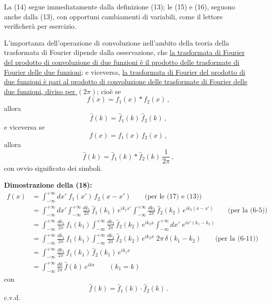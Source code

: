 \documentclass[11pt, a4paper]{book}
\numberwithin{equation}{section}
\begin{document}
La (14) segue immediatamente dalla definizione (13); le (15) e (16), seguono anche dalla (13), con opportuni cambiamenti di variabili, come il lettore verificherà per esercizio.

L'importanza dell'operazione di convoluzione nell'ambito della teoria della trasformata di Fourier dipende dalla osservazione, che \underline{la trasformata di Fourier del prodotto di convoluzione di due funzioni è il prodotto delle trasformate di Fourier delle due funzioni}; e viceversa, \underline{la trasformata di Fourier del prodotto di due funzioni è pari al prodotto di convoluzione delle trasformate di Fourier delle due funzioni, diviso per $(2\pi)$}; cioè se
\begin{equation}
  f(x) = f_1(x)*f_2(x)\,, \tag{17}
\end{equation}
allora
\begin{equation}
  \hat{f}(k) = \hat{f}_1(k)\,\hat{f}_2(k)\,, \tag{18}
\end{equation}
e viceversa se
\begin{equation}
  f(x) = f_1(x)\,f_2(x)\,, \tag{19}
\end{equation}
allora
\begin{equation}
  \hat{f}(k) = \hat{f}_1(k)*\hat{f}_2(k)\,\frac{1}{2\pi}\,, \tag{20}
\end{equation}
con ovvio significato dei simboli.

\textbf{Dimostrazione della (18):}
\begin{align*}
  f(x) &= \int_{-\infty}^{+\infty} dx'\;f_1(x')\,f_2(x-x')
    \qquad\text{(per le (17) e (13))}\\
  &= \int_{-\infty}^{+\infty} dx'\int_{-\infty}^{+\infty}\frac{dk_1}{2\pi}\,
    \hat{f}_1(k_1)\,e^{ik_1 x'}
    \int_{-\infty}^{+\infty}\frac{dk_2}{2\pi}\,\hat{f}_2(k_2)\,e^{ik_2(x-x')}
    \qquad\text{(per la (6-5))}\\
  &= \int_{-\infty}^{+\infty}\frac{dk_1}{2\pi}\,\hat{f}_1(k_1)
    \int_{-\infty}^{+\infty}\frac{dk_2}{2\pi}\,\hat{f}_2(k_2)\,e^{ik_2 x}
    \int_{-\infty}^{+\infty} dx'\;e^{ix'(k_1-k_2)}\\
  &= \int_{-\infty}^{+\infty}\frac{dk_1}{2\pi}\,\hat{f}_1(k_1)
    \int_{-\infty}^{+\infty}\frac{dk_2}{2\pi}\,\hat{f}_2(k_2)\,e^{ik_2 x}\;
    2\pi\,\delta(k_1-k_2)
    \qquad\text{(per la (6-11))}\\
  &= \int_{-\infty}^{+\infty}\frac{dk_1}{2\pi}\,\hat{f}_1(k_1)\,\hat{f}_2(k_1)\,e^{ik_1 x}\\
  &= \int_{-\infty}^{+\infty}\frac{dk}{2\pi}\,\hat{f}(k)\,e^{ikx}
    \qquad(k_1=k)
\end{align*}
con
\[
  \hat{f}(k) = \hat{f}_1(k)\cdot\hat{f}_2(k)\,.
\]
c.v.d.
\end{document}
